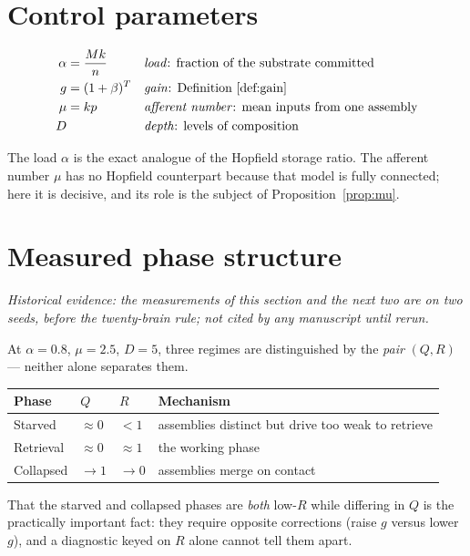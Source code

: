 \documentclass[11pt]{article}
\theoremstyle{definition}
\theoremstyle{plain}
\begin{document}
\section{Control parameters}

\begin{align}
  \alpha &= \frac{Mk}{n} && \text{\emph{load}: fraction of the substrate committed}\\
  g &= (1+\beta)^T && \text{\emph{gain}: Definition~\ref{def:gain}}\\
  \mu &= kp && \text{\emph{afferent number}: mean inputs from one assembly}\\
  D && &\text{\emph{depth}: levels of composition}
\end{align}

The load $\alpha$ is the exact analogue of the Hopfield storage ratio. The
afferent number $\mu$ has no Hopfield counterpart because that model is fully
connected; here it is decisive, and its role is the subject of
Proposition~\ref{prop:mu}.

\section{Measured phase structure}

\emph{Historical evidence: the measurements of this section and the next two
are on two seeds, before the twenty-brain rule; not cited by any manuscript
until rerun.}

At $\alpha = 0.8$, $\mu = 2.5$, $D = 5$, three regimes are distinguished by the
\emph{pair} $(Q, R)$ --- neither alone separates them.

\begin{center}
\begin{tabular}{llll}
\toprule
Phase & $Q$ & $R$ & Mechanism \\
\midrule
Starved   & $\approx 0$ & $<1$ & assemblies distinct but drive too weak to retrieve\\
Retrieval & $\approx 0$ & $\approx 1$ & the working phase \\
Collapsed & $\to 1$ & $\to 0$ & assemblies merge on contact \\
\bottomrule
\end{tabular}
\end{center}

That the starved and collapsed phases are \emph{both} low-$R$ while differing
in $Q$ is the practically important fact: they require opposite corrections
(raise $g$ versus lower $g$), and a diagnostic keyed on $R$ alone cannot tell
them apart.
\end{document}

